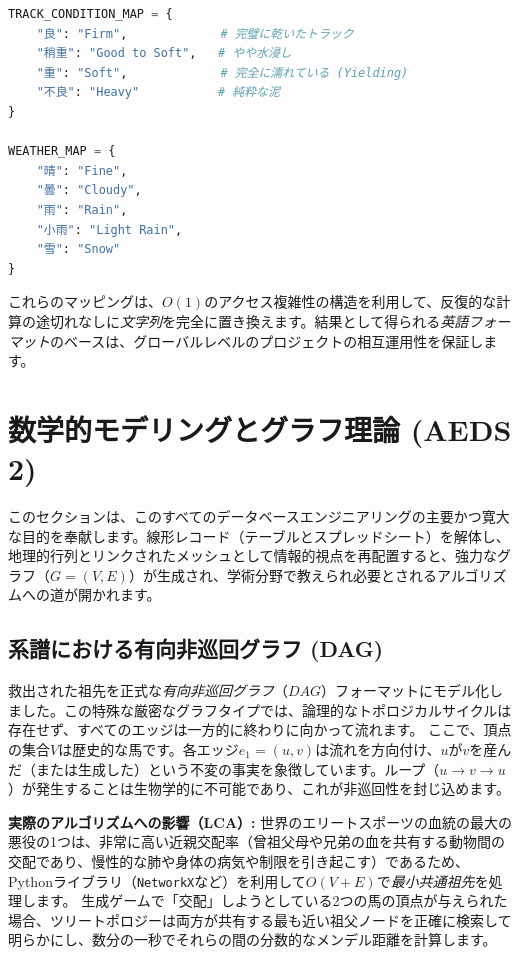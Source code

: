 \documentclass[12pt,a4paper]{article}
\begin{document}
\begin{lstlisting}[language=Python, caption=翻訳と変換のO(1)行列の静的辞書]
TRACK_CONDITION_MAP = {
    "良": "Firm",             # 完璧に乾いたトラック
    "稍重": "Good to Soft",   # やや水浸し
    "重": "Soft",             # 完全に濡れている (Yielding)
    "不良": "Heavy"           # 純粋な泥
}

WEATHER_MAP = {
    "晴": "Fine", 
    "曇": "Cloudy", 
    "雨": "Rain", 
    "小雨": "Light Rain", 
    "雪": "Snow"
}
\end{lstlisting}

これらのマッピングは、$O(1)$のアクセス複雑性の構造を利用して、反復的な計算の途切れなしに\textit{文字列}を完全に置き換えます。結果として得られる\textit{英語フォーマット}のベースは、グローバルレベルのプロジェクトの相互運用性を保証します。

\section{数学的モデリングとグラフ理論 (AEDS 2)}
このセクションは、このすべてのデータベースエンジニアリングの主要かつ寛大な目的を奉献します。線形レコード（テーブルとスプレッドシート）を解体し、地理的行列とリンクされたメッシュとして情報的視点を再配置すると、強力なグラフ（$G=(V, E)$）が生成され、学術分野で教えられ必要とされるアルゴリズムへの道が開かれます。

\subsection{系譜における有向非巡回グラフ (DAG)}
救出された祖先を正式な\textit{有向非巡回グラフ}（$DAG$）フォーマットにモデル化しました。この特殊な厳密なグラフタイプでは、論理的なトポロジカルサイクルは存在せず、すべてのエッジは一方的に終わりに向かって流れます。
ここで、頂点の集合$V$は歴史的な馬です。各エッジ$e_{1}=(u, v)$は流れを方向付け、$u$が$v$を産んだ（または生成した）という不変の事実を象徴しています。ループ（$u \to v \to u$）が発生することは生物学的に不可能であり、これが非巡回性を封じ込めます。

\textbf{実際のアルゴリズムへの影響（LCA）:} 世界のエリートスポーツの血統の最大の悪役の1つは、非常に高い近親交配率（曾祖父母や兄弟の血を共有する動物間の交配であり、慢性的な肺や身体の病気や制限を引き起こす）であるため、Pythonライブラリ（\texttt{NetworkX}など）を利用して$O(V+E)$で\textit{最小共通祖先}を処理します。
生成ゲームで「交配」しようとしている2つの馬の頂点が与えられた場合、ツリートポロジーは両方が共有する最も近い祖父ノードを正確に検索して明らかにし、数分の一秒でそれらの間の分数的なメンデル距離を計算します。
\end{document}
